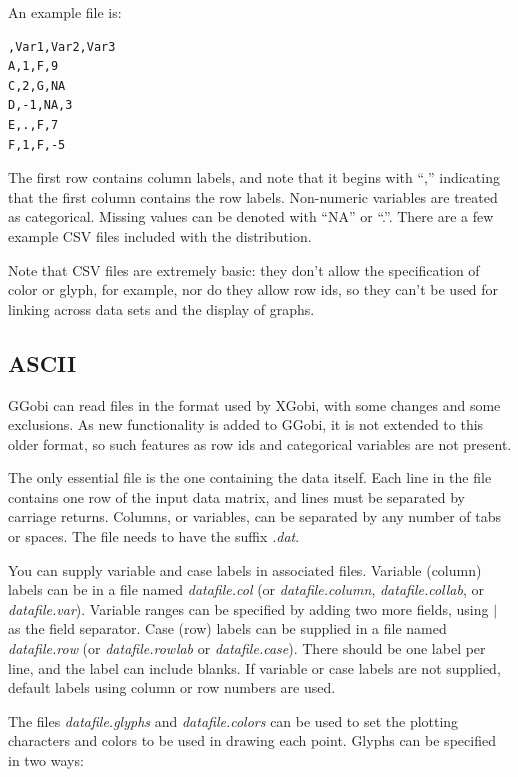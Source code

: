 \documentclass[11pt]{article}
\def\File#1{\textsl{#1}}
\begin{document}
An example file is:

\begin{verbatim}
,Var1,Var2,Var3
A,1,F,9
C,2,G,NA
D,-1,NA,3
E,.,F,7
F,1,F,-5
\end{verbatim}

The first row contains column labels, and note that it begins with
``,'' indicating that the first column contains the row labels.
Non-numeric variables are treated as categorical.  Missing values can
be denoted with ``NA'' or ``.''. There are a few example CSV
files included with the distribution.

Note that CSV files are extremely basic: they don't allow the
specification of color or glyph, for example, nor do they allow row
ids, so they can't be used for linking across data sets and the
display of graphs.

\subsection {ASCII}
\label{slbl:ASCII}

GGobi can read files in the format used by XGobi, with some changes
and some exclusions.  As new functionality is added to GGobi, it is
not extended to this older format, so such features as row ids and
categorical variables are not present.

The only essential file is the one containing the data itself.  Each
line in the file contains one row of the input data matrix, and lines
must be separated by carriage returns.  Columns, or variables, can be
separated by any number of tabs or spaces.  The file needs to have the
suffix \File{.dat}.

You can supply variable and case labels in associated files.  Variable
(column) labels can be in a file named \File{datafile.col} (or
\File{datafile.column}, \File{datafile.collab}, or
\File{datafile.var}).  Variable ranges can be specified by adding two
more fields, using $|$ as the field separator.  Case (row) labels can
be supplied in a file named \File{datafile.row} (or
\File{data\-file.row\-lab} or \File{data\-file.case}).  There should
be one label per line, and the label can include blanks.  If variable
or case labels are not supplied, default labels using column or row
numbers are used.

The files \File{datafile.glyphs} and \File{datafile.colors} can be
used to set the plotting characters and colors to be used in
drawing each point.  Glyphs can be specified in two ways:
\end{document}
